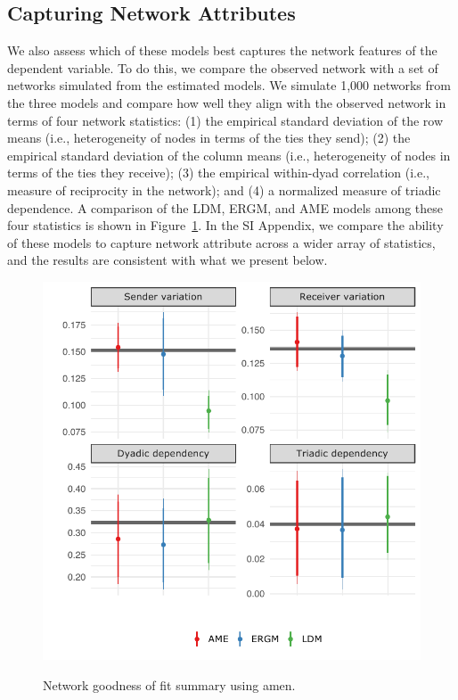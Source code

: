 \documentclass[12pt,twocolumn,twoside]{pnas-new}
\newcommand{\pkg}[1]{{\fontseries{b}\selectfont #1}}
\begin{document}
\FloatBarrier

\subsection*{Capturing Network Attributes}

We also assess which of these models best captures the network features of the dependent variable. To do this, we compare the observed network with a set of networks simulated from the estimated models. We simulate 1,000 networks from the three models and compare how well they align with the observed network in terms of four network statistics: (1) the empirical standard deviation of the row means (i.e., heterogeneity of nodes in terms of the ties they send); (2) the empirical standard deviation of the column means (i.e., heterogeneity of nodes in terms of the ties they receive); (3) the empirical within-dyad correlation (i.e., measure of reciprocity in the network); and (4) a normalized measure of triadic dependence. A comparison of the LDM, ERGM, and AME models among these four statistics is shown in Figure~\ref{fig:ergmAmePerf}. In the SI Appendix, we compare the ability of these models to capture network attribute across a wider array of statistics, and the results are consistent with what we present below.

\begin{figure}[ht]
	\centering
	\caption{Network goodness of fit summary using \pkg{amen}.}
	\includegraphics[width=.5\textwidth]{netPerfCoef_vert}
	\label{fig:ergmAmePerf}
\end{figure}
\FloatBarrier
\end{document}
